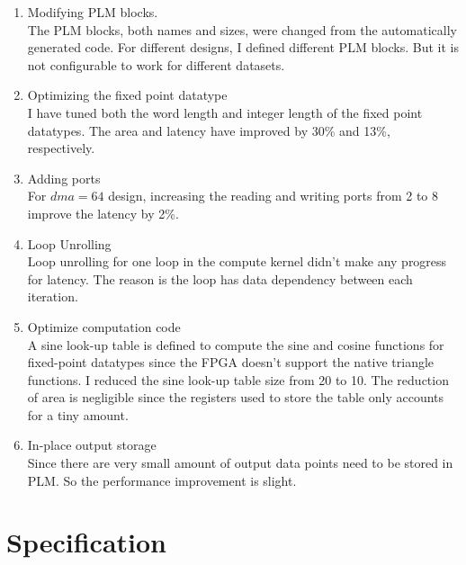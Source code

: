 \documentclass{sig-alternate}
\begin{document}
\vspace{-0.1in}
\begin{enumerate}
\setlength\itemsep{-0.15em}
  \item Modifying PLM blocks. 
  \vspace{2mm}
  \\
  The PLM blocks, both names and sizes, were changed from the automatically generated code. For different designs, I defined different PLM blocks. But it is not configurable to work for different datasets.
  \item Optimizing the fixed point datatype
   \vspace{2mm}
   \\
    I have tuned both the word length and integer length of the fixed point datatypes. The area and latency have improved by 30\% and 13\%, respectively.

  \item Adding ports 
    \vspace{2mm}
  \\
  For $dma = 64$ design, increasing the reading and writing ports from 2 to 8 improve the latency by 2\%. 
  \item Loop Unrolling
    \vspace{2mm}
  \\
  Loop unrolling for one loop in the compute kernel didn't make any progress for latency. The reason is the loop has data dependency between each iteration.
  \item Optimize computation code
    \vspace{2mm}
  \\
  A sine look-up table is defined to compute the sine and cosine functions for fixed-point datatypes since the FPGA doesn't support the native triangle functions. I reduced the sine look-up table size from 20 to 10. The reduction of area is negligible since the registers used to store the table only accounts for a tiny amount.
  \item In-place output storage
    \vspace{2mm}
  \\
 Since there are very small amount of output data points need to be stored in PLM. So the performance improvement is slight.
\end{enumerate}

\section{Specification}
\end{document}
